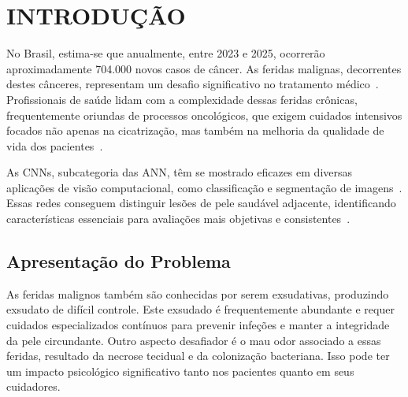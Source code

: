 \section{INTRODUÇÃO}
No Brasil, estima-se que anualmente, entre 2023 e 2025, ocorrerão aproximadamente 704.000 novos casos de câncer. As feridas malignas, decorrentes destes cânceres, representam um desafio significativo no tratamento médico~\cite{de2023estimativa}. Profissionais de saúde lidam com a complexidade dessas feridas crônicas, frequentemente oriundas de processos oncológicos, que exigem cuidados intensivos focados não apenas na cicatrização, mas também na melhoria da qualidade de vida dos pacientes~\cite{freitas2017intervenccoes, agra2017neoplastic}.

 As \acp{CNN}, subcategoria das \ac{ANN}, têm se mostrado eficazes em diversas aplicações de visão computacional, como classificação e segmentação de imagens~\cite{sun2023convolution}. Essas redes conseguem distinguir lesões de pele saudável adjacente, identificando características essenciais para avaliações mais objetivas e consistentes~\cite{litjens2017, lundervold2019, esteva2019}.

\subsection{Apresentação do Problema}

  

As feridas malignos também são conhecidas por serem exsudativas, produzindo exsudato de difícil controle. Este exsudado é frequentemente abundante e requer cuidados especializados contínuos para prevenir infeções e manter a integridade da pele circundante. Outro aspecto desafiador é o mau odor associado a essas feridas, resultado da necrose tecidual e da colonização bacteriana. Isso pode ter um impacto psicológico significativo tanto nos pacientes quanto em seus cuidadores. 

